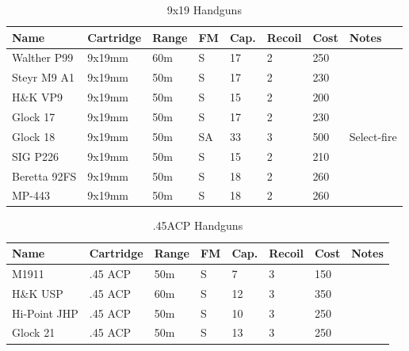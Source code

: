 \begin{table}
  \caption{9x19 Handguns}
  \begin{center}
    \begin{tabular}{| l | l | l | l | l | l | l | l |}
      \hline
      \textbf{Name} & \textbf{Cartridge} & \textbf{Range} &
      \textbf{FM} & \textbf{Cap.} & \textbf{Recoil} &
      \textbf{Cost} & \textbf{Notes} \\ \hline

      Walther P99  & 9x19mm & 60m & S  & 17 & 2 & 250 & \\ \hline
      Steyr M9 A1  & 9x19mm & 50m & S  & 17 & 2 & 230 & \\ \hline
      H\&K VP9      & 9x19mm & 50m & S  & 15 & 2 & 200 & \\ \hline
      Glock 17     & 9x19mm & 50m & S  & 17 & 2 & 230 & \\ \hline
      Glock 18     & 9x19mm & 50m & SA & 33 & 3 & 500 & Select-fire \\ \hline
      SIG P226     & 9x19mm & 50m & S  & 15 & 2 & 210 & \\ \hline
      Beretta 92FS & 9x19mm & 50m & S  & 18 & 2 & 260 & \\ \hline
      MP-443       & 9x19mm & 50m & S  & 18 & 2 & 260 & \\ \hline

    \end{tabular}
  \end{center}
\end{table}

\begin{table}
  \caption{.45ACP Handguns}
  \begin{center}
    \begin{tabular}{| l | l | l | l | l | l | l | l |}
      \hline
      \textbf{Name} & \textbf{Cartridge} & \textbf{Range} &
      \textbf{FM} & \textbf{Cap.} & \textbf{Recoil} &
      \textbf{Cost} & \textbf{Notes} \\ \hline

      M1911        & .45 ACP & 50m & S &  7 & 3  & 150 & \\ \hline
      H\&K USP      & .45 ACP & 60m & S & 12 & 3  & 350 & \\ \hline
      Hi-Point JHP & .45 ACP & 50m & S & 10 & 3  & 250 & \\ \hline
      Glock 21     & .45 ACP & 50m & S & 13 & 3  & 250 & \\ \hline

    \end{tabular}
  \end{center}
\end{table}

